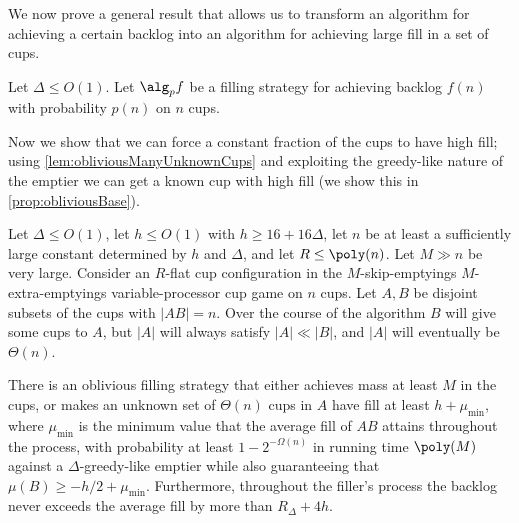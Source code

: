 We now prove a general result that allows us to transform an algorithm
for achieving a certain backlog into an algorithm for achieving
large fill in a set of cups. 
\begin{lemma}
  \label{lem:rep}
  Let $\Delta \le O(1)$. Let $\alg_p{f}$ be a filling strategy for
  achieving backlog $f(n)$ with probability $p(n)$ on $n$ cups.
\end{lemma}


Now we show that we can force a constant fraction of the cups to
have high fill; using \cref{lem:obliviousManyUnknownCups} and
exploiting the greedy-like nature of the emptier we can get a
known cup with high fill (we show this in
\cref{prop:obliviousBase}).
\begin{lemma}
  \label{lem:obliviousManyUnknownCups}
  Let $\Delta \le O(1)$, let $h \le O(1)$ with $h \ge
  16+16\Delta$, let $n$ be at least a sufficiently large constant
  determined by $h$ and $\Delta$, and let $R \le \poly(n)$.
  Let $M\gg n$ be very large.
  Consider an $R$-flat cup configuration in the
  $M$-skip-emptyings $M$-extra-emptyings
  variable-processor cup game on $n$ cups.
  Let $A, B$ be disjoint subsets of the cups with $|AB| = n$.
  Over the course of the algorithm $B$ will give some cups to
  $A$, but $|A|$ will always satisfy $|A| \ll |B|$, and $|A|$
  will eventually be $\Theta(n)$.

  There is an oblivious filling strategy that either achieves
  mass at least $M$ in the cups, or makes an unknown
  set of $\Theta(n)$ cups in $A$ have fill at least $h +
  \mu_{\min}$, where $\mu_{\min}$ is the minimum value that the
  average fill of $AB$ attains throughout the process, with
  probability at least $1-2^{-\Omega(n)}$ in running time
  $\poly(M)$ against a $\Delta$-greedy-like emptier while also
  guaranteeing that $\mu(B) \ge -h/2 + \mu_{\min}$. Furthermore, throughout
  the filler's process the backlog never exceeds the average
  fill by more than $R_\Delta + 4h$.
\end{lemma}
